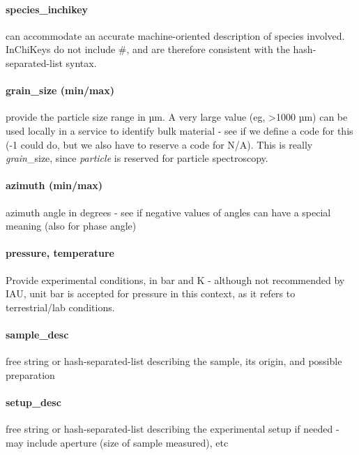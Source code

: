 \documentclass[11pt,a4paper]{ivoa}
\begin{document}
\paragraph{\textbf{species\_inchikey} }

can accommodate an accurate machine-oriented description of species involved. InChiKeys do not include \#, and are therefore consistent with the hash-separated-list syntax.

\paragraph{grain\_size (min/max)}

provide the particle size range in µm. A very large value (eg, >1000 µm) can be used locally in a service to identify bulk material - see if we define a code for this (-1 could do, but we also have to reserve a code for N/A). This is really \emph{grain}\_size, since \emph{particle} is reserved for particle spectroscopy.\\

\paragraph{azimuth (min/max)}

azimuth angle in degrees - see if negative values of angles can have a special meaning (also for phase angle)

\paragraph{pressure, temperature}

Provide experimental conditions, in bar and K - although not recommended by IAU, unit bar is accepted for pressure in this context, as it refers to terrestrial/lab conditions.

\paragraph{sample\_desc}

free string or hash-separated-list describing the sample, its origin, and possible preparation

\paragraph{setup\_desc}

free string or hash-separated-list describing the experimental setup if needed - may include aperture (size of sample measured), etc
\end{document}
